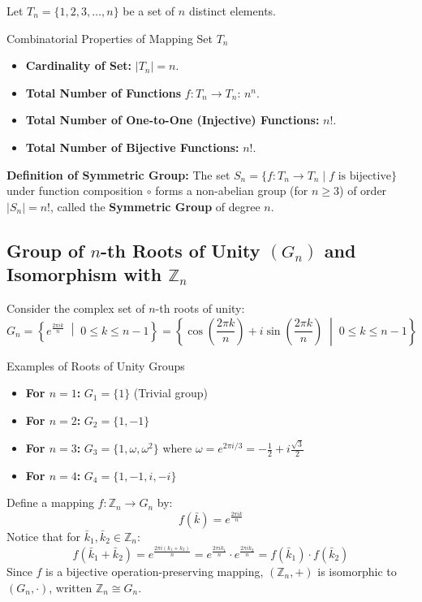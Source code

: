 \documentclass[11pt,a4paper]{article}
\begin{document}
Let $T_n = \{1, 2, 3, \dots, n\}$ be a set of $n$ distinct elements.

\begin{defbox}{Combinatorial Properties of Mapping Set $T_n$}
\begin{itemize}
    \item \textbf{Cardinality of Set:} $|T_n| = n$.
    \item \textbf{Total Number of Functions} $f: T_n \to T_n$: $n^n$.
    \item \textbf{Total Number of One-to-One (Injective) Functions:} $n!$.
    \item \textbf{Total Number of Bijective Functions:} $n!$.
\end{itemize}
\textbf{Definition of Symmetric Group:} The set $S_n = \{ f: T_n \to T_n \mid f \text{ is bijective} \}$ under function composition $\circ$ forms a non-abelian group (for $n \ge 3$) of order $|S_n| = n!$, called the \textbf{Symmetric Group} of degree $n$.
\end{defbox}

\subsection{Group of $n$-th Roots of Unity \texorpdfstring{$(G_n)$}{(Gn)} and Isomorphism with \texorpdfstring{$\mathbb{Z}_n$}{Zn}}

Consider the complex set of $n$-th roots of unity:
\begin{equation}
    G_n = \left\{ e^{\frac{2\pi i k}{n}} \;\middle|\; 0 \le k \le n-1 \right\} = \left\{ \cos\left(\frac{2\pi k}{n}\right) + i \sin\left(\frac{2\pi k}{n}\right) \;\middle|\; 0 \le k \le n-1 \right\}
\end{equation}

\begin{exbox}{Examples of Roots of Unity Groups}
\begin{itemize}
    \item \textbf{For $n=1$:} $G_1 = \{1\}$ (Trivial group)
    \item \textbf{For $n=2$:} $G_2 = \{1, -1\}$
    \item \textbf{For $n=3$:} $G_3 = \{1, \omega, \omega^2\}$ where $\omega = e^{2\pi i / 3} = -\frac{1}{2} + i\frac{\sqrt{3}}{2}$
    \item \textbf{For $n=4$:} $G_4 = \{1, -1, i, -i\}$
\end{itemize}
\end{exbox}

Define a mapping $f: \mathbb{Z}_n \to G_n$ by:
\begin{equation}
    f(\bar{k}) = e^{\frac{2\pi i k}{n}}
\end{equation}
Notice that for $\bar{k}_1, \bar{k}_2 \in \mathbb{Z}_n$:
\begin{equation}
    f(\bar{k}_1 + \bar{k}_2) = e^{\frac{2\pi i (k_1 + k_2)}{n}} = e^{\frac{2\pi i k_1}{n}} \cdot e^{\frac{2\pi i k_2}{n}} = f(\bar{k}_1) \cdot f(\bar{k}_2)
\end{equation}
Since $f$ is a bijective operation-preserving mapping, $(\mathbb{Z}_n, +)$ is isomorphic to $(G_n, \cdot)$, written $\mathbb{Z}_n \cong G_n$.
\end{document}
